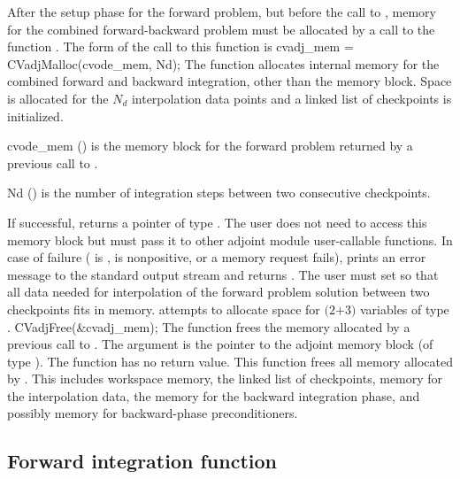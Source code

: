 After the setup phase for the forward problem, but before the call
to , memory for the combined forward-backward problem must be
allocated by a call to the function .
The form of the call to this function is
{
  cvadj\_mem = CVadjMalloc(cvode\_mem, Nd);
}
{
  The function  allocates internal memory for the combined
  forward and backward integration, other than the {\cvodes} memory block. 
  Space is allocated for the $N_d$ interpolation data points and a linked 
  list of checkpoints is initialized.
}
{
  \begin{args}
  \item[cvode\_mem] () 
    is the {\cvodes} memory block for the forward problem
    returned by a previous call to .
  \item[Nd] () 
    is the number of integration steps between two consecutive checkpoints.
  \end{args}
}
{
  If successful,  returns a pointer of type . The user
  does not need to access this memory block but must pass it to other adjoint module
  user-callable functions. In case of failure ( is ,  is
  nonpositive, or a memory request fails),  prints an error
  message to the standard output stream  and returns .
}
{
  The user must set  so that all data needed for interpolation of the 
  forward problem solution between two checkpoints fits in memory. 
  attempts to allocate space for $(2$$+3)$ variables of type .
}
{
  CVadjFree(\&cvadj\_mem);
}
{
  The function  frees the memory allocated by
  a previous call to .
}
{
  The argument is the pointer to the adjoint memory block (of type ).
}
{
  The function  has no return value.
}
{
  This function frees all memory allocated by . This includes workspace memory, 
  the linked list of checkpoints, memory for the interpolation data, the {\cvodes} memory 
  for the backward integration phase, and possibly memory for backward-phase preconditioners.
}


\subsection{Forward integration function}\label{sss:cvodef}

